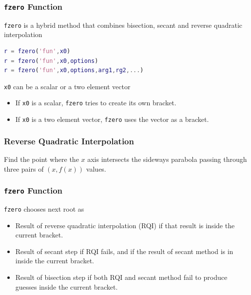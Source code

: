 \documentclass[10pt]{beamer}
\begin{document}
\begin{frame}[fragile]
\frametitle{\texttt{fzero} Function}

\texttt{fzero} is a hybrid method that combines bisection,
secant and reverse quadratic interpolation

\vspace{3ex}
\begin{lstlisting}[language=matlab]
r = fzero('fun',x0)
r = fzero('fun',x0,options)
r = fzero('fun',x0,options,arg1,rg2,...)
\end{lstlisting}

\vspace{3ex}
\texttt{x0} can be a scalar or a two element vector
\begin{itemize}
    \item   If \texttt{x0} is a scalar, \texttt{fzero} tries to
            create its own bracket.
    \item   If \texttt{x0} is a two element vector, \texttt{fzero}
            uses the vector as a bracket.
\end{itemize}



\end{frame}
\begin{frame}
\frametitle{Reverse Quadratic Interpolation}

\vspace{2ex}
Find the point where the $x$ axis intersects the sideways parabola passing
through three pairs of $(x,f(x))$ values.

\begin{center}
\end{center}

\end{frame}
\begin{frame}
\frametitle{\texttt{fzero} Function}

\texttt{fzero} chooses next root as
\begin{itemize}
    \item   Result of reverse quadratic interpolation (RQI) if that result
            is inside the current bracket.
    \item   Result of secant step if RQI fails, and if the result of secant
            method is in inside the current bracket.
    \item   Result of bisection step if both RQI and secant method fail
            to produce guesses inside the current bracket.
\end{itemize}

\end{frame}
\end{document}
